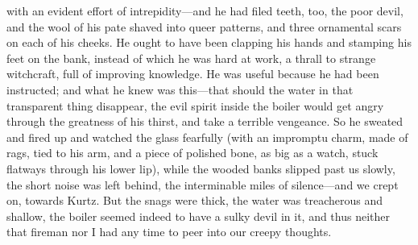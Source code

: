 \documentclass[12pt]{report}
\begin{document}
with an evident effort of intrepidity---and he had filed teeth, too, the
poor devil, and the wool of his pate shaved into queer patterns, and
three ornamental scars on each of his cheeks. He ought to have been
clapping his hands and stamping his feet on the bank, instead of which
he was hard at work, a thrall to strange witchcraft, full of improving
knowledge. He was useful because he had been instructed; and what he
knew was this---that should the water in that transparent thing
disappear, the evil spirit inside the boiler would get angry through the
greatness of his thirst, and take a terrible vengeance. So he sweated
and fired up and watched the glass fearfully (with an impromptu charm,
made of rags, tied to his arm, and a piece of polished bone, as big as a
watch, stuck flatways through his lower lip), while the wooded banks
slipped past us slowly, the short noise was left behind, the
interminable miles of silence---and we crept on, towards Kurtz. But the
snags were thick, the water was treacherous and shallow, the boiler
seemed indeed to have a sulky devil in it, and thus neither that fireman
nor I had any time to peer into our creepy thoughts.
\end{document}
